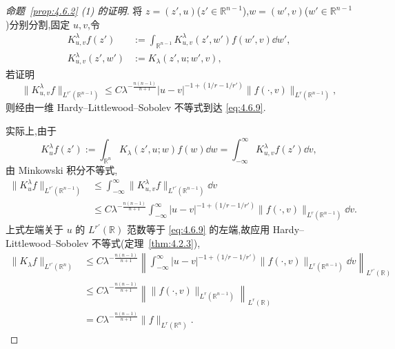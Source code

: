 \begin{proof}[命题~\ref{prop:4.6.2} (1) 的证明]
将 $z = (z', u)$($z' \in \mathbb{R}^{n-1}$),$w = (w', v)$($w' \in \mathbb{R}^{n-1}$)分别分割,固定 $u, v$,令
\begin{equation}
\begin{aligned}
K_{u,v}^{\lambda}f(z') & := \int_{\mathbb{R}^{n-1}}K_{u,v}^{\lambda}(z', w')f(w', v)\dd w', \\
K_{u,v}^{\lambda}(z', w') & := K_{\lambda}(z', u; w', v),
\end{aligned}
\end{equation}
若证明
\begin{equation}
\|K_{u,v}^{\lambda}f\|_{L^{r'}(\mathbb{R}^{n-1})} \leq C\lambda^{-\frac{n(n-1)}{n+1}}|u - v|^{-1+(1/r - 1/r')}\|f(\cdot, v)\|_{L^{r}(\mathbb{R}^{n-1})},\tag{4.6.10}
\label{eq:4.6.10}\end{equation}
则经由一维 Hardy--Littlewood--Sobolev 不等式到达 \eqref{eq:4.6.9}.

实际上,由于
\begin{equation*}
K_{u}^{\lambda}f(z') := \int_{\mathbb{R}^{n}}K_{\lambda}(z', u; w)f(w)\dd w = \int_{-\infty}^{\infty}K_{u,v}^{\lambda}f(z')\dd v,
\end{equation*}
由 Minkowski 积分不等式,
\begin{equation}
\begin{aligned}
\|K_{u}^{\lambda}f\|_{L^{r'}(\mathbb{R}^{n-1})} & \leq \int_{-\infty}^{\infty}\|K_{u,v}^{\lambda}f\|_{L^{r'}(\mathbb{R}^{n-1})}\dd v \\
& \leq C\lambda^{-\frac{n(n-1)}{n+1}}\int_{-\infty}^{\infty}|u - v|^{-1+(1/r - 1/r')}\|f(\cdot, v)\|_{L^{r}(\mathbb{R}^{n-1})}\dd v.
\end{aligned}
\end{equation}
上式左端关于 $u$ 的 $L^{r'}(\mathbb{R})$ 范数等于 \eqref{eq:4.6.9} 的左端,故应用 Hardy--Littlewood--Sobolev 不等式(定理~\ref{thm:4.2.3}),
\begin{equation}
\begin{aligned}
\|K_{\lambda}f\|_{L^{r'}(\mathbb{R}^{n})} & \leq C\lambda^{-\frac{n(n-1)}{n+1}}\left\|\int_{-\infty}^{\infty}|u - v|^{-1+(1/r - 1/r')}\|f(\cdot, v)\|_{L^{r}(\mathbb{R}^{n-1})}\dd v\right\|_{L^{r'}(\mathbb{R})} \\
& \leq C\lambda^{-\frac{n(n-1)}{n+1}}\left\|\|f(\cdot, v)\|_{L^{r}(\mathbb{R}^{n-1})}\right\|_{L^{r}(\mathbb{R})} \\
& = C\lambda^{-\frac{n(n-1)}{n+1}}\|f\|_{L^{r}(\mathbb{R}^{n})}.
\end{aligned}
\end{equation}


\end{proof}
